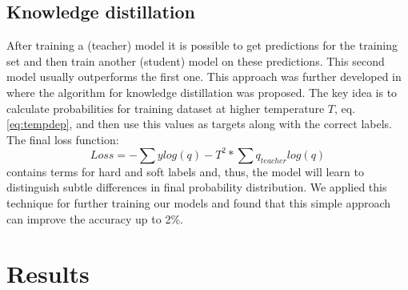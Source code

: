 \documentclass{article}
\begin{document}
\subsection{Knowledge distillation}
After training a (teacher) model it is possible to get predictions for the training set and then train another (student) model on these predictions. This second model usually outperforms the first one. This approach was further developed in\cite{Hinton} where the algorithm for knowledge distillation was proposed. The key idea is to calculate probabilities for training dataset at higher temperature $T$, eq. \ref{eq:tempdep}, and then use this values as targets along with the correct labels. The final loss function:
\begin{equation}
\label{eq:hard}
Loss = -\sum y log(q) - T^2 * \sum q_{teacher} log(q)  
\end{equation}
contains terms for hard and soft labels and, thus, the model will learn to distinguish subtle differences in final probability distribution. We applied this technique for further training our models and found that this simple approach can improve the accuracy up to 2\%.

\section{Results}
\label{sec:results}
\end{document}
